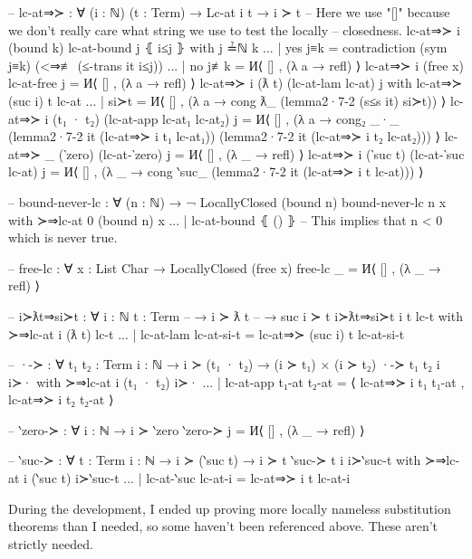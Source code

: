 \documentclass[logo,bsc,singlespacing,parskip,online]{infthesis}
\renewenvironment{code}{\mintedcopy[breaklines,breaksymbolleft=\;]{agda}}{\endmintedcopy}
\begin{document}
\begin{code}
-- lc-at⇒≻ : ∀ (i : ℕ) (t : Term) → Lc-at i t → i ≻ t
-- Here we use "[]" because we don't really care what string we use to test the locally
-- closedness.
lc-at⇒≻ i (bound k) lc-at-bound j ⦃ i≤j ⦄ with j ≟ℕ k
... | yes j≡k = contradiction (sym j≡k) (<⇒≢ (≤-trans it i≤j))
... | no  j≢k = И⟨ [] , (λ a → refl) ⟩
lc-at⇒≻ i (free x) lc-at-free j = И⟨ [] , (λ a → refl) ⟩
lc-at⇒≻ i (ƛ t) (lc-at-lam lc-at) j with lc-at⇒≻ (suc i) t lc-at
... | si≻t = И⟨ [] , (λ a → cong ƛ_ (lemma2·7-2 (s≤s it) si≻t)) ⟩
lc-at⇒≻ i (t₁ · t₂) (lc-at-app lc-at₁ lc-at₂) j =
  И⟨ []
  , (λ a →
    cong₂ _·_
      (lemma2·7-2 it (lc-at⇒≻ i t₁ lc-at₁))
      (lemma2·7-2 it (lc-at⇒≻ i t₂ lc-at₂))) ⟩
lc-at⇒≻ _ (‵zero) (lc-at-‵zero) j = И⟨ [] , (λ _ → refl) ⟩
lc-at⇒≻ i (‵suc t) (lc-at-‵suc lc-at) j =
  И⟨ []
  , (λ _ → cong ‵suc_ (lemma2·7-2 it (lc-at⇒≻ i t lc-at))) ⟩

-- bound-never-lc : ∀ (n : ℕ) → ¬ LocallyClosed (bound n)
bound-never-lc n x with ≻⇒lc-at 0 (bound n) x
... | lc-at-bound ⦃ () ⦄ -- This implies that n < 0 which is never true.

-- free-lc : ∀ {x : List Char} → LocallyClosed (free x)
free-lc _ = И⟨ [] , (λ _ → refl) ⟩

-- i≻ƛt⇒si≻t : ∀ {i : ℕ} {t : Term}
--   → i ≻ ƛ t
--   → suc i ≻ t
i≻ƛt⇒si≻t {i} {t} lc-t with ≻⇒lc-at i (ƛ t) lc-t
... | lc-at-lam lc-at-si-t = lc-at⇒≻ (suc i) t lc-at-si-t

-- ·-≻ : ∀ {t₁ t₂ : Term} {i : ℕ} → i ≻ (t₁ · t₂) → (i ≻ t₁) × (i ≻ t₂)
·-≻ {t₁} {t₂} {i} i≻· with ≻⇒lc-at i (t₁ · t₂) i≻·
... | lc-at-app t₁-at t₂-at = ⟨ lc-at⇒≻ i t₁ t₁-at , lc-at⇒≻ i t₂ t₂-at ⟩

-- ‵zero-≻ : ∀ {i : ℕ} → i ≻ ‵zero
‵zero-≻ j = И⟨ [] , (λ _ → refl) ⟩

-- ‵suc-≻ : ∀ {t : Term} {i : ℕ} → i ≻ (‵suc t) → i ≻ t
‵suc-≻ {t} {i} i≻‵suc-t with ≻⇒lc-at i (‵suc t) i≻‵suc-t
... | lc-at-‵suc lc-at-i = lc-at⇒≻ i t lc-at-i
\end{code}

During the development, I ended up proving more locally nameless substitution theorems than I
needed, so some haven't been referenced above. These aren't strictly needed.
\end{document}
